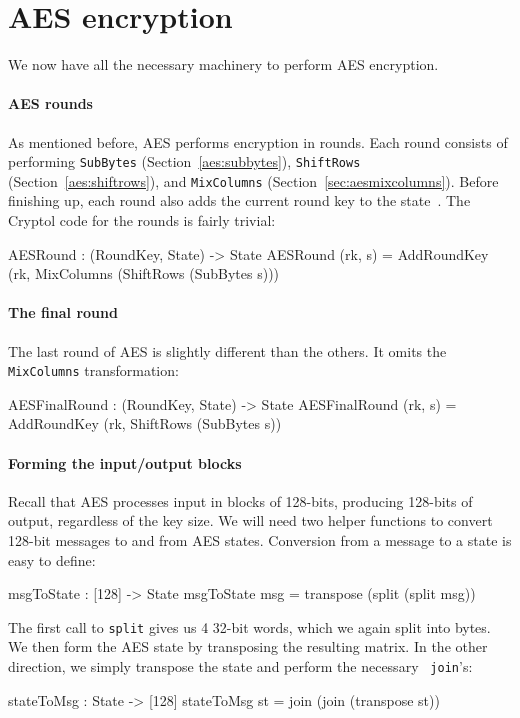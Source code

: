 \section{AES encryption}
\label{sec:aes:encryption}

We now have all the necessary machinery to perform AES\indAES
encryption.

\paragraph*{AES rounds} As mentioned before, AES performs encryption in
rounds. Each round consists of performing {\tt SubBytes}
(Section~\ref{aes:subbytes}), {\tt ShiftRows}
(Section~\ref{aes:shiftrows}), and {\tt MixColumns}
(Section~\ref{sec:aesmixcolumns}). Before finishing up, each round
also adds the current round key to the state~\cite[Section
5.1]{aes}. The Cryptol code for the rounds is fairly trivial:
\begin{code}
  AESRound : (RoundKey, State) -> State
  AESRound (rk, s) = AddRoundKey (rk,
                                  MixColumns (ShiftRows (SubBytes s)))
\end{code}

\paragraph*{The final round} The last round of AES is slightly
different than the others. It omits the {\tt MixColumns}
transformation:
\begin{code}
  AESFinalRound : (RoundKey, State) -> State
  AESFinalRound (rk, s) = AddRoundKey (rk, ShiftRows (SubBytes s))
\end{code}

\paragraph*{Forming the input/output blocks} Recall that AES processes
input in blocks of 128-bits, producing 128-bits of output, regardless
of the key size.  We will need two helper functions to convert 128-bit
messages to and from AES states.  Conversion from a message to a state
is easy to define:
\begin{code}
  msgToState : [128] -> State
  msgToState msg = transpose (split (split msg))
\end{code}
The first call to {\tt split} gives us 4 32-bit words, which we again
split into bytes.  We then form the AES state by transposing the
resulting matrix.  In the other direction, we simply transpose the
state and perform the necessary {\tt
  join}'s:\indTranspose\indJoin\indReverse\indSplit
\begin{code}
  stateToMsg : State -> [128]
  stateToMsg st = join (join (transpose st))
\end{code}

